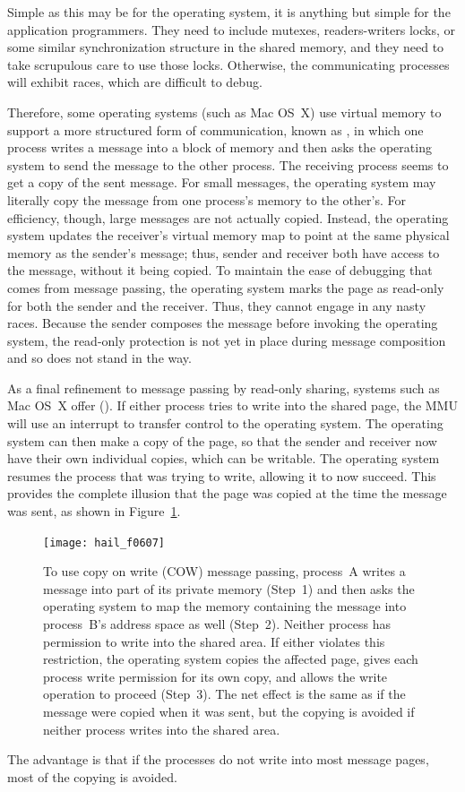 Simple as this may be for the operating system, it is anything but
simple for the application programmers.  They need to include mutexes,
readers-writers locks, or some similar synchronization structure in
the shared memory, and they need to take scrupulous care to use those
locks.  Otherwise, the communicating processes will exhibit races,
which are difficult to debug.

Therefore, some operating systems (such as Mac OS~X) use virtual
memory to support a more structured form of communication, known as
, in which
one process writes a message into a block of memory and then asks the
operating system to send the message to the other process.  The
receiving process seems to get a copy of the sent message.  For small
messages, the operating system may literally copy the message from one
process's memory to the other's.  For efficiency, though, large
messages are not actually copied.  Instead, the operating system
updates the receiver's virtual memory map to point at the same
physical memory as the sender's message; thus, sender and receiver
both have access to the message, without it being copied.  To maintain
the ease of debugging that comes from message passing, the operating
system marks the page as read-only for both the sender and the
receiver.  Thus, they cannot engage in any nasty races.  Because the
sender composes the message before invoking the operating system, the
read-only protection is not yet in place during message composition
and so does not stand in the way.

As a final refinement to message passing by read-only sharing, systems
such as Mac OS~X offer  ().  If either
process tries to write into the shared page, the MMU will use an
interrupt to transfer control to the operating system.  The operating
system can then make a copy of the page, so that the sender and
receiver now have their own individual copies, which can be
writable.  The operating system resumes the process that was trying
to write, allowing it to now succeed.  This provides the complete
illusion that the page was copied at the time the message was sent, as
shown in Figure~\ref{scan-6-5}.
\begin{figure}
\centerline{\texttt{[image: hail\_f0607]}}
\caption{To use copy on write (COW) message passing, process~A
  writes a message into part of its private memory (Step~1) and then
  asks the operating system to map the memory containing the message into process~B's
  address space as well (Step~2).  Neither process has permission to write into
  the shared area.  If either violates this restriction, the operating
  system copies the affected page, gives each process write
  permission for its own copy, and allows the write operation to
  proceed (Step~3).  The net effect is the same as if the message were copied
  when it was sent, but the copying is avoided if neither process writes into
  the shared area.}
\label{scan-6-5}
\end{figure}
The advantage is that if the processes do not write into most message pages, most
of the copying is avoided.

